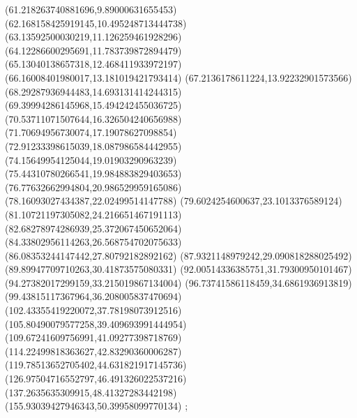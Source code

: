 {(61.218263740881696,9.89000631655453)
(62.168158425919145,10.495248713444738)
(63.13592500030219,11.126259461928296)
(64.12286600295691,11.783739872894479)
(65.13040138657318,12.468411933972197)
(66.16008401980017,13.181019421793414)
(67.2136178611224,13.92232901573566)
(68.29287936944483,14.693131414244315)
(69.39994286145968,15.494242455036725)
(70.53711071507644,16.326504240656988)
(71.70694956730074,17.19078627098854)
(72.91233398615039,18.087986584442955)
(74.15649954125044,19.01903290963239)
(75.44310780266541,19.984883829403653)
(76.77632662994804,20.986529959165086)
(78.16093027434387,22.02499514147788)
(79.6024254600637,23.1013376589124)
(81.10721197305082,24.216651467191113)
(82.68278974286939,25.372067450652064)
(84.33802956114263,26.568754702075633)
(86.08353244147442,27.80792182892162)
(87.9321148979242,29.090818288025492)
(89.89947709710263,30.41873575080331)
(92.00514336385751,31.79300950101467)
(94.27382017299159,33.215019867134004)
(96.73741586118459,34.6861936913819)
(99.43815117367964,36.208005837470694)
(102.43355419220072,37.78198073912516)
(105.80490079577258,39.409693991444954)
(109.67241609756991,41.09277398718769)
(114.22499818363627,42.83290360006287)
(119.78513652705402,44.631821917145736)
(126.97504716552797,46.491326022537216)
(137.2635635309915,48.41327283442198)
(155.93039427946343,50.39958099770134)
};
